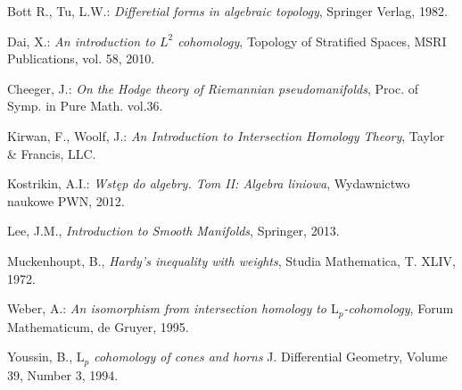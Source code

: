 \documentclass[licencjacka]{pracamgr}
\theoremstyle{definition}
\theoremstyle{definition}
\theoremstyle{plain}
\theoremstyle{plain}
\theoremstyle{plain}
\theoremstyle{plain}
\theoremstyle{plain}
\def\cfm{\ensuremath\mathrm{C}^fM}
\def\M{\ensuremath M}
\begin{document}

\begin{thebibliography}{99}

 Bott R., Tu, L.W.: \textit{Differetial forms in algebraic
  topology}, Springer Verlag, 1982.

 Dai, X.: \textit{An introduction to $L^2$ cohomology},
Topology of Stratified Spaces, MSRI Publications, vol. 58, 2010.

 Cheeger, J.: \textit{On the Hodge theory
  of Riemannian pseudomanifolds}, Proc. of Symp. in Pure Math. vol.36.

  Kirwan, F., Woolf, J.: \textit{An Introduction
to Intersection Homology Theory}, Taylor \& Francis, LLC.

 Kostrikin, A.I.: \textit{Wstęp do algebry.
Tom II: Algebra liniowa}, Wydawnictwo naukowe PWN, 2012.

 Lee, J.M., \textit{Introduction to Smooth Manifolds},
Springer, 2013.

 Muckenhoupt, B., \textit{Hardy's inequality
with weights}, Studia Mathematica, T. XLIV, 1972.

  Weber, A.: \textit{An isomorphism from
  intersection homology to $\mathrm{L}_p$-cohomology}, Forum
  Mathematicum, de Gruyer, 1995.

 Youssin, B., \textit{$\mathrm{L}_p$
  cohomology of cones and horns } J. Differential Geometry, Volume 39,
  Number 3, 1994.

\end{thebibliography}
\end{document}
